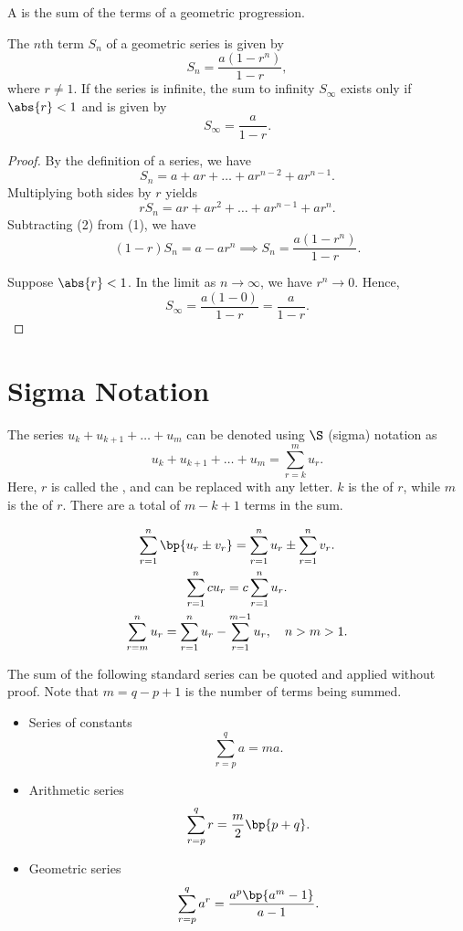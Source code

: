 \begin{definition}
    A  is the sum of the terms of a geometric progression.
\end{definition}

\begin{proposition}
    The $n$th term $S_n$ of a geometric series is given by \[S_n = \frac{a(1 - r^n)}{1 - r},\] where $r \neq 1$. If the series is infinite, the sum to infinity $S_\infty$ exists only if $\abs{r} < 1$ and is given by \[S_\infty = \frac{a}{1 - r}.\]
\end{proposition}
\begin{proof}
    By the definition of a series, we have \[S_n = a + ar + \dots + ar^{n-2} + ar^{n-1}. \tag{1}\] Multiplying both sides by $r$ yields \[r S_n = ar + ar^2 + \dots + ar^{n-1} + ar^{n}. \tag{2}\] Subtracting (2) from (1), we have \[(1-r)S_n = a - ar^{n} \implies S_n = \frac{a(1 - r^{n})}{1 - r}.\]
    
    Suppose $\abs{r} < 1$. In the limit as $n \to \infty$, we have $r^n \to 0$. Hence, \[S_\infty = \frac{a(1 - 0)}{1 - r} = \frac{a}{1-r}.\]
\end{proof}

\section{Sigma Notation}

\begin{definition}
    The series $u_k + u_{k+1} + \dots + u_m$ can be denoted using $\S$ (sigma) notation as \[u_k + u_{k+1} + \dots + u_m = \sum_{r=k}^m u_r.\] Here, $r$ is called the , and can be replaced with any letter. $k$ is the  of $r$, while $m$ is the  of $r$. There are a total of $m - k + 1$ terms in the sum.
\end{definition}

\begin{fact}
    \begin{gather*}
        \sum_{r = 1}^n \bp{u_r \pm v_r} = \sum_{r = 1}^n u_r \pm \sum_{r = 1}^n v_r.\\
        \sum_{r = 1}^n cu_r = c\sum_{r = 1}^n u_r.\\
        \sum_{r = m}^n u_r = \sum_{r = 1}^n u_r - \sum_{r = 1}^{m-1} u_r, \quad n > m > 1.
    \end{gather*}
\end{fact}

\begin{fact}
    The sum of the following standard series can be quoted and applied without proof. Note that $m = q - p + 1$ is the number of terms being summed.

    \begin{itemize}
        \item Series of constants \[\sum_{r = p}^q a = ma.\]
        \item Arithmetic series \[\sum_{r = p}^q r = \frac{m}{2} \bp{p + q}.\]
        \item Geometric series \[\sum_{r = p}^q a^r = \frac{a^p \bp{a^m - 1}}{a - 1}.\]
    \end{itemize}
\end{fact}
